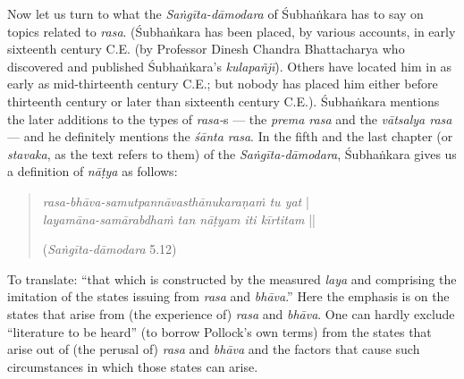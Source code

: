 Now let us turn to what the \textsl{Saṅgīta-dāmodara} of Śubhaṅkara has to say on topics related to \textsl{rasa}. (Śubhaṅkara has been placed, by various accounts, in early sixteenth century C.E. (by Professor Dinesh Chandra Bhattacharya who discovered and published Śubhaṅkara’s \textsl{kulapañjī}). Others have located him in as early as mid-thirteenth century C.E.; but nobody has placed him either before thirteenth century or later than sixteenth century C.E.). Śubhaṅkara mentions the later additions to the types of \textsl{rasa-}s --- the \textsl{prema rasa} and the \textsl{vātsalya rasa} --- and he definitely mentions the \textsl{śānta rasa}. In the fifth and the last chapter (or \textsl{stavaka}, as the text refers to them) of the \textsl{Saṅgīta-dāmodara}, Śubhaṅkara gives us a definition of \textsl{nāṭya} as follows:
\begin{quote}
\textsl{rasa-bhāva-samutpannāvasthānukaraṇaṁ tu yat} |\\
\textsl{layamāna-samārabdhaṁ tan nāṭyam iti kīrtitam} || 

\hfill (\textsl{Saṅgīta-dāmodara} 5.12) 
\end{quote}

To translate: “that which is constructed by the measured \textsl{laya} and comprising the imitation of the states issuing from \textsl{rasa} and \textsl{bhāva}.” Here the emphasis is on the states that arise from (the experience of) \textsl{rasa} and \textsl{bhāva}. One can hardly exclude “literature to be heard” (to borrow Pollock’s own terms) from the states that arise out of (the perusal of) \textsl{rasa} and \textsl{bhāva} and the factors that cause such circumstances in which those states can arise. 

